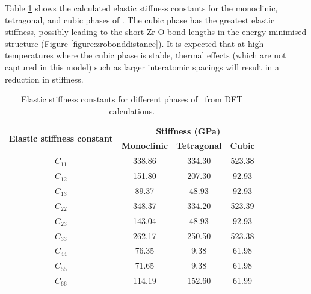 Table \ref{stiffness_tensor} shows the calculated elastic stiffness constants for the monoclinic, tetragonal, and cubic phases of \zirconia . The cubic phase has the greatest elastic stiffness, possibly leading to the short Zr-O bond lengths in the energy-minimised structure (Figure \ref{figure:zrobonddistance}). It is expected that at high temperatures where the cubic phase is stable, thermal effects (which are not captured in this model) such as larger interatomic spacings will result in a reduction in stiffness.

\begin{table}[ht] %
\onehalfspacing
\centering
\caption{Elastic stiffness constants for different phases of \zirconia\ from DFT calculations.}
\label{stiffness_tensor}
\begin{tabular}{cccc}
\hline
\multirow{2}{*}{\textbf{Elastic stiffness constant}} & \multicolumn{3}{c}{\textbf{Stiffness (GPa)}}               \\ \cline{2-4} 
                                            & \textbf{Monoclinic} & \textbf{Tetragonal} & \textbf{Cubic} \\ \hline
$C_{11}$                                         & 338.86        & 334.30               & 523.38    \\
$C_{12}$                                         & 151.80        & 207.30               & 92.93     \\
$C_{13}$                                         & 89.37         & 48.93               & 92.93     \\
$C_{22}$                                         & 348.37        & 334.20               & 523.39    \\
$C_{23}$                                         & 143.04        & 48.93               & 92.93    \\
$C_{33}$                                         & 262.17        & 250.50               & 523.38   \\
$C_{44}$                                         & 76.35         & 9.38                & 61.98    \\
$C_{55}$                                         & 71.65         & 9.38                & 61.98   \\
$C_{66}$                                         & 114.19        & 152.60               & 61.99     \\ \hline
\end{tabular}
\end{table}

